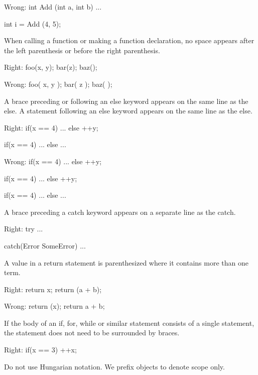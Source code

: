 Wrong:
\startCodeExample
int Add (int a, int b)
{
    ...
}

int i = Add (4, 5);
\stopCodeExample

\item
When calling a function or making a function declaration, no space appears after the left parenthesis or before the right parenthesis.

Right:
\startCodeExample
foo(x, y);
bar(z);
baz();
\stopCodeExample

Wrong:
\startCodeExample
foo( x, y );
bar( z );
baz( );
\stopCodeExample

\item
A brace preceding or following an else keyword appears on the same line as the else. A statement following an else keyword appears on the same line as the else. 

Right:
\startCodeExample
if(x == 4)
{
    ...
}
else
  ++y;

if(x == 4)
{
    ...
}
else
{
    ...
}
\stopCodeExample

Wrong:
\startCodeExample
if(x == 4) {
    ...
}
else ++y;

if(x == 4) {
    ...
} else ++y;

if(x == 4) {
    ...
}
else {
    ...
}
\stopCodeExample

\item
A brace preceding a catch keyword appears on a separate line as the catch. 

Right:
\startCodeExample
try
{
    ...
}

catch(Error SomeError)
{
    ...
}
\stopCodeExample

\item
A value in a return statement is parenthesized where it contains more than one term.

Right:
\startCodeExample
return x;
return (a + b);
\stopCodeExample

Wrong:
\startCodeExample
return (x);
return a + b;
\stopCodeExample

\item
If the body of an if, for, while or similar statement consists of a single statement, the statement does not need to be surrounded by braces.


Right:
\startCodeExample
if(x == 3)
  ++x;
\stopCodeExample

\stopitemize



\startitemize[3]
\setupwhitespace[big]
\item
Do not use Hungarian notation. We prefix objects to denote scope only.



